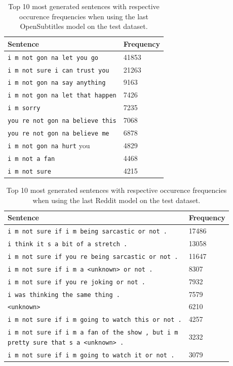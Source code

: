 \begin{table}[H]
	\centering
	\begin{adjustbox}{max width=\textwidth}
		\begin{tabular}{ll}
			\toprule
			Sentence & Frequency\\ \midrule
			\texttt{i m not gon na let you go} & 41853\\
			\texttt{i m not sure i can trust you} & 21263\\
			\texttt{i m not gon na say anything} & 9163\\
			\texttt{i m not gon na let that happen} & 7426\\
			\texttt{i m sorry} & 7235\\
			\texttt{you re not gon na believe this} & 7068\\
			\texttt{you re not gon na believe me} & 6878\\
			\texttt{i m not gon na hurt} you & 4829\\
			\texttt{i m not a fan} & 4468\\
			\texttt{i m not sure} & 4215\\
			\bottomrule
		\end{tabular}
	\end{adjustbox}
	\caption{Top 10 most generated sentences with respective occurence frequencies when using the last OpenSubtitles model on the test dataset.}
	\label{results:test_performance:opensubtitles_sample_outputs}
\end{table}

\begin{table}[H]
\centering
{}
\begin{adjustbox}{max width=\textwidth}
	\begin{tabular}{ll}
		\toprule
		Sentence & Frequency\\ \midrule
		\texttt{i m not sure if i m being sarcastic or not .} & 17486\\
		\texttt{i think it s a bit of a stretch .} & 13058\\
		\texttt{i m not sure if you re being sarcastic or not .} & 11647\\
		\texttt{i m not sure if i m a <unknown> or not .} & 8307\\
		\texttt{i m not sure if you re joking or not .} & 7932\\
		\texttt{i was thinking the same thing .} & 7579\\
		\texttt{<unknown>} & 6210\\
		\texttt{i m not sure if i m going to watch this or not .} & 4257\\
		\specialcell{\texttt{i m not sure if i m a fan of the show , but i m}\\\texttt{pretty sure that s a <unknown> .}} & 3232\\
		\texttt{i m not sure if i m going to watch it or not .} & 3079\\
		\bottomrule
	\end{tabular}
\end{adjustbox}
\caption{Top 10 most generated sentences with respective occurence frequencies when using the last Reddit model on the test dataset.}
\label{results:test_performance:reddit_sample_outputs}
\end{table}

